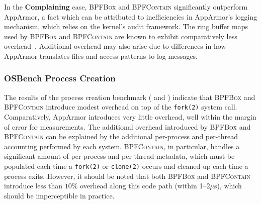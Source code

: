 \documentclass[
  fontsize=12pt,
  titlepage=firstiscover,
  paper=letter,
oneside,
  cleardoublepage=plain,
  parskip=half-,
  DIV=10,
  parindent,
  appendixprefix,
  chapterprefix,
  listof=totoc,
]{scrbook}
\newcommand{\bpfbox}{\textsc{BPFBox}}
\newcommand{\bpfcontain}{\textsc{BPFContain}}
\begin{document}
In the \textbf{Complaining} case, \bpfbox{} and \bpfcontain{} significantly outperform
AppArmor, a fact which can be attributed to inefficiencies in AppArmor's logging
mechanism, which relies on the kernel's audit framework. The ring buffer maps used by
\bpfbox{} and \bpfcontain{} are known to exhibit comparatively less
overhead~\cite{zeng2015_auditing, zhang2021_lsm_file_overhead, nakryiko2020_ringbuf}.
Additional overhead may also arise due to differences in how AppArmor translates files and
access patterns to log messages.

\subsubsection{OSBench Process Creation}

The results of the process creation benchmark ( and ) indicate
that \bpfbox{} and \bpfcontain{} introduce modest overhead on top of the \texttt{fork(2)}
system call.  Comparatively, AppArmor introduces very little overhead, well within the
margin of error for measurements. The additional overhead introduced by \bpfbox{} and
\bpfcontain{} can be explained by the additional per-process and per-thread accounting
performed by each system. \bpfcontain{}, in particular, handles a significant amount of
per-process and per-thread metadata, which must be populated each time a \texttt{fork(2)}
or \texttt{clone(2)} occurs and cleaned up each time a process exits. However, it should
be noted that both \bpfbox{} and \bpfcontain{} introduce less than $10\%$ overhead along
this code path (within 1--2$\mu$s), which should be imperceptible in practice.
\end{document}
